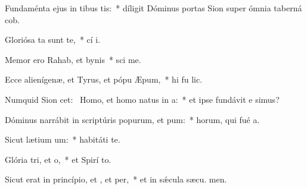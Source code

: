 \item Fundaménta ejus in tibus tis:~* díligit Dóminus portas Sion super ómnia taberná cob.
\item Gloriósa ta sunt  te,~* cí i.
\item Memor ero Rahab, et bynis~* sci me.
\item Ecce alienígenæ, et Tyrus, et pópu Æpum,~* hi fu lic.
\item Numquid Sion cet:~\pscross{} Homo, et homo natus  in a:~* et ipse fundávit e simus?
\item Dóminus narrábit in scriptúris popurum, et pum:~* horum, qui fué  a.
\item Sicut lætium um:~* habitáti   te.
\item Glória tri, et o,~* et Spirí to.
\item Sicut erat in princípio, et , et per,~* et in sǽcula sæcu. men.
